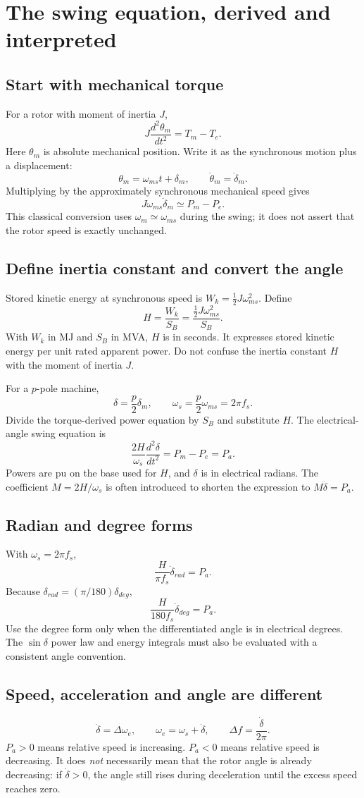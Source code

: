 \documentclass[11pt,a4paper]{article}
\newcommand{\chapterstart}[2]{\par\needspace{12\baselineskip}\section{#1}\label{#2}}
\newcommand{\ans}[1]{\boxed{#1}}
\begin{document}
\chapterstart{The swing equation, derived and interpreted}{swing}
\subsection{Start with mechanical torque}
For a rotor with moment of inertia $J$,
\[
J\frac{d^2\theta_m}{dt^2}=T_m-T_e.
\]
Here $\theta_m$ is absolute mechanical position. Write it as the synchronous motion plus a displacement:
\[
\theta_m=\omega_{ms}t+\delta_m,
\qquad \ddot\theta_m=\ddot\delta_m.
\]
Multiplying by the approximately synchronous mechanical speed gives
\[
J\omega_{ms}\ddot\delta_m\simeq P_m-P_e.
\]
This classical conversion uses $\omega_m\simeq\omega_{ms}$ during the swing; it does not assert that the rotor speed is exactly unchanged.
\subsection{Define inertia constant and convert the angle}
Stored kinetic energy at synchronous speed is $W_k=\tfrac12J\omega_{ms}^2$. Define
\[
\ans{H=\frac{W_k}{S_B}=\frac{\tfrac12J\omega_{ms}^2}{S_B}}.
\]
With $W_k$ in MJ and $S_B$ in MVA, $H$ is in seconds. It expresses stored kinetic energy per unit rated apparent power. Do not confuse the inertia constant $H$ with the moment of inertia $J$.

For a $p$-pole machine,
\[
\delta=\frac p2\delta_m,\qquad
\omega_s=\frac p2\omega_{ms}=2\pi f_s.
\]
Divide the torque-derived power equation by $S_B$ and substitute $H$. The electrical-angle swing equation is
\[
\ans{\frac{2H}{\omega_s}\frac{d^2\delta}{dt^2}=P_m-P_e=P_a}.
\]
Powers are pu on the base used for $H$, and $\delta$ is in electrical radians. The coefficient $M=2H/\omega_s$ is often introduced to shorten the expression to $M\ddot\delta=P_a$.
\subsection{Radian and degree forms}
With $\omega_s=2\pi f_s$,
\[
\frac{H}{\pi f_s}\ddot\delta_{rad}=P_a.
\]
Because $\delta_{rad}=(\pi/180)\delta_{deg}$,
\[
\ans{\frac{H}{180f_s}\ddot\delta_{deg}=P_a}.
\]
Use the degree form only when the differentiated angle is in electrical degrees. The $\sin\delta$ power law and energy integrals must also be evaluated with a consistent angle convention.
\subsection{Speed, acceleration and angle are different}
\[
\dot\delta=\Delta\omega_e,\qquad
\omega_e=\omega_s+\dot\delta,\qquad
\Delta f=\frac{\dot\delta}{2\pi}.
\]
$P_a>0$ means relative speed is increasing. $P_a<0$ means relative speed is decreasing. It does \emph{not} necessarily mean that the rotor angle is already decreasing: if $\dot\delta>0$, the angle still rises during deceleration until the excess speed reaches zero.
\end{document}
